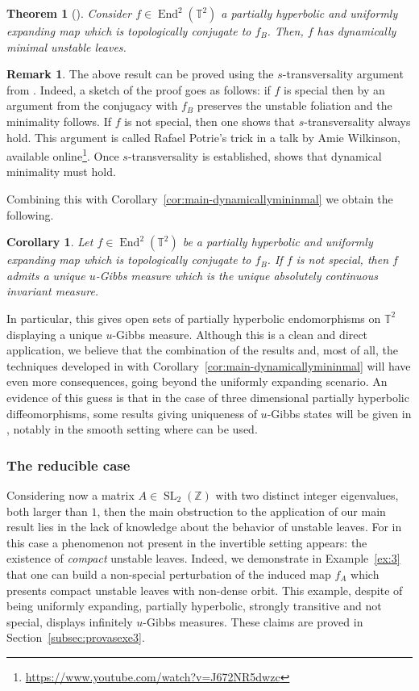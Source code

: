\documentclass[a4paper,11pt,reqno]{amsart}
\newcommand{\Z}{{\mathbb Z}}
\newcommand{\TT}{{\mathbb{T}^2}}
\newtheorem{theorem}{Theorem}[section]
\newtheorem{corollary}{Corollary}
\theoremstyle{definition}
\newtheorem{remark}{Remark}
\begin{document}
\begin{theorem}[\cite{ACEPWZ}]
Consider $f\in\operatorname{End}^2(\TT)$ a partially hyperbolic and uniformly expanding map which is topologically conjugate to $f_B$. Then, $f$ has dynamically minimal unstable leaves.
\end{theorem}

\begin{remark}
The above result can be proved using the $s$-transversality argument from \cite{ACW}. Indeed, a sketch of the proof goes as follows: if $f$ is special then by an argument from \cite{yu} the conjugacy with $f_B$ preserves the unstable foliation and the minimality follows. If $f$ is not special, then one shows that $s$-transversality always hold. This argument is called Rafael Potrie's trick in a talk by Amie Wilkinson, available online\footnote{\url{https://www.youtube.com/watch?v=J672NR5dwzc}}. Once $s$-transversality is established, \cite{ACW} shows that dynamical minimality must hold.
\end{remark}

Combining this with Corollary~\ref{cor:main-dynamicallymininmal} we obtain the following.

\begin{corollary}
    \label{cor:main-irredutivel}
Let $f\in\operatorname{End}^2(\TT)$ be a partially hyperbolic and uniformly expanding map which is topologically conjugate to $f_B$. If $f$ is not special, then $f$ admits a unique $u$-Gibbs measure which is the unique absolutely continuous invariant measure.   
\end{corollary}

In particular, this gives open sets of partially hyperbolic endomorphisms on $\TT$ displaying a unique $u$-Gibbs measure. Although this is a clean and direct application, we believe that the combination of the results and, most of all, the techniques developed in \cite{ACEPWZ} with Corollary~\ref{cor:main-dynamicallymininmal} will have even more consequences, going beyond the uniformly expanding scenario. An evidence of this guess is that in the case of three dimensional partially hyperbolic diffeomorphisms, some results giving uniqueness of $u$-Gibbs states will be given in \cite{ACEPWZ}, notably in the smooth setting where \cite{Katz} can be used. 

\subsubsection{The reducible case} Considering now a matrix $A\in\operatorname{SL}_2(\Z)$ with two distinct integer eigenvalues, both larger than $1$, then the main obstruction to the application of our main result lies in the lack of knowledge about the behavior of unstable leaves. For in this case a phenomenon not present in the invertible setting appears: the existence of \emph{compact} unstable leaves. Indeed, we demonstrate in Example~\ref{ex:3} that one can build a non-special perturbation of the induced map $f_A$ which presents compact unstable leaves with non-dense orbit. This example, despite of being uniformly expanding, partially hyperbolic, {strongly transitive} and not special, displays infinitely $u$-Gibbs measures. These claims are proved in Section~\ref{subsec:provasexe3}. 
\end{document}
